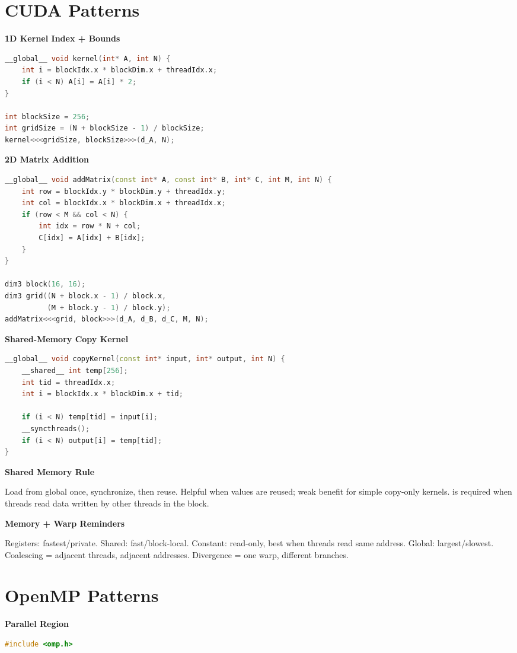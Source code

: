 \documentclass[9pt]{extarticle}
\newcommand{\code}[1]{\texttt{\detokenize{#1}}}
\newcommand{\subhead}[1]{\textbf{#1}\par}
\begin{document}
\begin{multicols}{2}
\section{CUDA Patterns}
\subhead{1D Kernel Index + Bounds}
\begin{lstlisting}[language=C++]
__global__ void kernel(int* A, int N) {
    int i = blockIdx.x * blockDim.x + threadIdx.x;
    if (i < N) A[i] = A[i] * 2;
}

int blockSize = 256;
int gridSize = (N + blockSize - 1) / blockSize;
kernel<<<gridSize, blockSize>>>(d_A, N);
\end{lstlisting}

\subhead{2D Matrix Addition}
\begin{lstlisting}[language=C++]
__global__ void addMatrix(const int* A, const int* B, int* C, int M, int N) {
    int row = blockIdx.y * blockDim.y + threadIdx.y;
    int col = blockIdx.x * blockDim.x + threadIdx.x;
    if (row < M && col < N) {
        int idx = row * N + col;
        C[idx] = A[idx] + B[idx];
    }
}

dim3 block(16, 16);
dim3 grid((N + block.x - 1) / block.x,
          (M + block.y - 1) / block.y);
addMatrix<<<grid, block>>>(d_A, d_B, d_C, M, N);
\end{lstlisting}

\subhead{Shared-Memory Copy Kernel}
\begin{lstlisting}[language=C++]
__global__ void copyKernel(const int* input, int* output, int N) {
    __shared__ int temp[256];
    int tid = threadIdx.x;
    int i = blockIdx.x * blockDim.x + tid;

    if (i < N) temp[tid] = input[i];
    __syncthreads();
    if (i < N) output[i] = temp[tid];
}
\end{lstlisting}

\subhead{Shared Memory Rule}
Load from global once, synchronize, then reuse. Helpful when values are reused; weak benefit for simple copy-only kernels. \code{__syncthreads()} is required when threads read data written by other threads in the block.

\subhead{Memory + Warp Reminders}
Registers: fastest/private. Shared: fast/block-local. Constant: read-only, best when threads read same address. Global: largest/slowest. Coalescing = adjacent threads, adjacent addresses. Divergence = one warp, different branches.

\section{OpenMP Patterns}
\subhead{Parallel Region}
\begin{lstlisting}[language=C++]
#include <omp.h>


\end{lstlisting}
\end{multicols}
\end{document}

